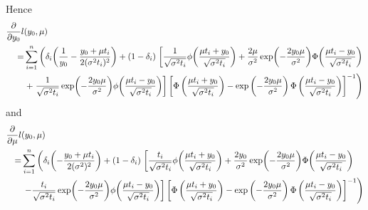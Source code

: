 Hence
\begin{align}
\begin{split}
\frac{\partial}{\partial y_0}
l&(y_0,\mu) \\
=&\sum_{i=1}^n\left(
\di\p*{\frac{1}{y_0}-\frac{y_0+\mu\ti}{2(\sigma^2\ti)^2}}
+(1-\di)\right.\left[
    \frac{1}{\sqrt{\sigma^2\ti}}\phi\p*{\frac{\mu\ti+y_0}{\sqrt{\sigma^2\ti}}}+\frac{2\mu}{\sigma^2}\exp\p*{-\frac{2y_0\mu}{\sigma^2}}\Phi\p*{\frac{\mu\ti-y_0}{\sqrt{\sigma^2\ti}}}\right.\\
    &\left.+\left.
    \frac{1}{\sqrt{\sigma^2\ti}}\exp\p*{-\frac{2y_0\mu}{\sigma^2}}\phi\p*{\frac{\mu\ti-y_0}{\sqrt{\sigma^2\ti}}}
\right]\left[ \Phi\left(\frac{\mu t_i + y_0}{\sqrt{\sigma^2 t_i}}\right)-\exp\left(-\frac{2y_0\mu}{\sigma^2}\right)\Phi\left(\frac{\mu t_i - y_0}{\sqrt{\sigma^2 t_i}}\right)\right]^{-1}\right)
\end{split}
\end{align}
and
\begin{align}
\begin{split}
\frac{\partial}{\partial \mu}
l&(y_0,\mu) \\
=&\sum_{i=1}^n\left(
\di\p*{-\frac{y_0+\mu\ti}{2(\sigma^2)^2}}
+(1-\di)\right.\left[
\frac{\ti}{\sqrt{\sigma^2\ti}}\phi\p*{\frac{\mu\ti+y_0}{\sqrt{\sigma^2\ti}}}+\frac{2y_0}{\sigma^2}\exp\p*{-\frac{2y_0\mu}{\sigma^2}}\Phi\p*{\frac{\mu\ti-y_0}{\sqrt{\sigma^2\ti}}} \right.\\
&\left.\left.-\frac{\ti}{\sqrt{\sigma^2\ti}}\exp\p*{-\frac{2y_0\mu}{\sigma^2}}\phi\p*{\frac{\mu\ti-y_0}{\sqrt{\sigma^2\ti}}}
\right]\left[ \Phi\left(\frac{\mu t_i + y_0}{\sqrt{\sigma^2 t_i}}\right)-\exp\left(-\frac{2y_0\mu}{\sigma^2}\right)\Phi\left(\frac{\mu t_i - y_0}{\sqrt{\sigma^2 t_i}}\right)\right]^{-1}\right)
\end{split}
\end{align}